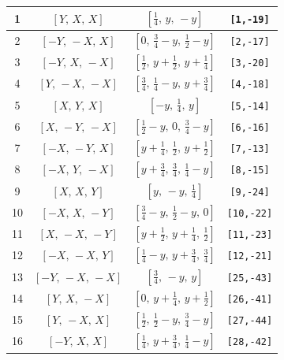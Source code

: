 \documentclass[fleqn,8pt]{jsarticle}
\begin{document}
\begin{longtable}{cccc}
1 & $\left[ Y,\, X,\, X \right]$ & $\left[ \frac{1}{4},\, y,\, - y \right]$ & {\tt [1,-19]} \\ \hline
2 & $\left[ - Y,\, - X,\, X \right]$ & $\left[ 0,\, \frac{3}{4} - y,\, \frac{1}{2} - y \right]$ & {\tt [2,-17]} \\ \hline
3 & $\left[ - Y,\, X,\, - X \right]$ & $\left[ \frac{1}{2},\, y + \frac{1}{2},\, y + \frac{1}{4} \right]$ & {\tt [3,-20]} \\ \hline
4 & $\left[ Y,\, - X,\, - X \right]$ & $\left[ \frac{3}{4},\, \frac{1}{4} - y,\, y + \frac{3}{4} \right]$ & {\tt [4,-18]} \\ \hline
5 & $\left[ X,\, Y,\, X \right]$ & $\left[ - y,\, \frac{1}{4},\, y \right]$ & {\tt [5,-14]} \\ \hline
6 & $\left[ X,\, - Y,\, - X \right]$ & $\left[ \frac{1}{2} - y,\, 0,\, \frac{3}{4} - y \right]$ & {\tt [6,-16]} \\ \hline
7 & $\left[ - X,\, - Y,\, X \right]$ & $\left[ y + \frac{1}{4},\, \frac{1}{2},\, y + \frac{1}{2} \right]$ & {\tt [7,-13]} \\ \hline
8 & $\left[ - X,\, Y,\, - X \right]$ & $\left[ y + \frac{3}{4},\, \frac{3}{4},\, \frac{1}{4} - y \right]$ & {\tt [8,-15]} \\ \hline
9 & $\left[ X,\, X,\, Y \right]$ & $\left[ y,\, - y,\, \frac{1}{4} \right]$ & {\tt [9,-24]} \\ \hline
10 & $\left[ - X,\, X,\, - Y \right]$ & $\left[ \frac{3}{4} - y,\, \frac{1}{2} - y,\, 0 \right]$ & {\tt [10,-22]} \\ \hline
11 & $\left[ X,\, - X,\, - Y \right]$ & $\left[ y + \frac{1}{2},\, y + \frac{1}{4},\, \frac{1}{2} \right]$ & {\tt [11,-23]} \\ \hline
12 & $\left[ - X,\, - X,\, Y \right]$ & $\left[ \frac{1}{4} - y,\, y + \frac{3}{4},\, \frac{3}{4} \right]$ & {\tt [12,-21]} \\ \hline
13 & $\left[ - Y,\, - X,\, - X \right]$ & $\left[ \frac{3}{4},\, - y,\, y \right]$ & {\tt [25,-43]} \\ \hline
14 & $\left[ Y,\, X,\, - X \right]$ & $\left[ 0,\, y + \frac{1}{4},\, y + \frac{1}{2} \right]$ & {\tt [26,-41]} \\ \hline
15 & $\left[ Y,\, - X,\, X \right]$ & $\left[ \frac{1}{2},\, \frac{1}{2} - y,\, \frac{3}{4} - y \right]$ & {\tt [27,-44]} \\ \hline
16 & $\left[ - Y,\, X,\, X \right]$ & $\left[ \frac{1}{4},\, y + \frac{3}{4},\, \frac{1}{4} - y \right]$ & {\tt [28,-42]} \\ \hline

\end{longtable}
\end{document}

